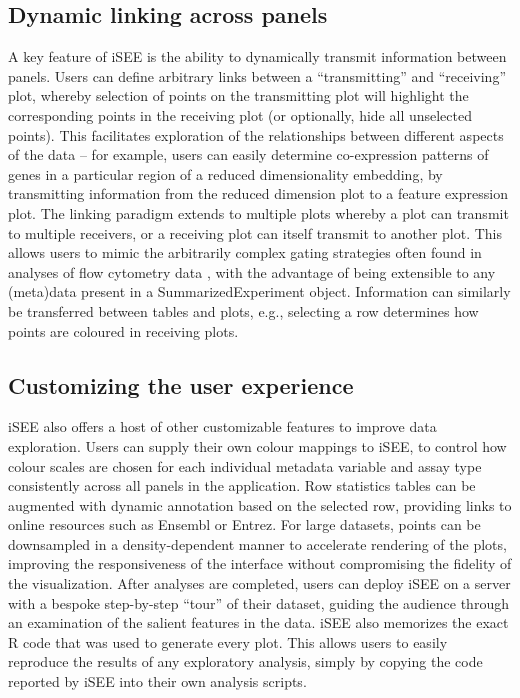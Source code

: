 \documentclass{bioinfo}
\begin{document}
\subsection{Dynamic linking across panels}
A key feature of iSEE is the ability to dynamically transmit information between panels. 
Users can define arbitrary links between a ``transmitting'' and ``receiving'' plot, whereby selection of points on the transmitting plot will highlight the corresponding points in the receiving plot (or optionally, hide all unselected points). 
This facilitates exploration of the relationships between different aspects of the data -- for example, users can easily determine co-expression patterns of genes in a particular region of a reduced dimensionality embedding, by transmitting information from the reduced dimension plot to a feature expression plot. 
The linking paradigm extends to multiple plots whereby a plot can transmit to multiple receivers, or a receiving plot can itself transmit to another plot.
This allows users to mimic the arbitrarily complex gating strategies often found in analyses of flow cytometry data \citep{finak2014opencyto}, with the advantage of being extensible to any (meta)data present in a SummarizedExperiment object. 
Information can similarly be transferred between tables and plots, e.g., selecting a row determines how points are coloured in receiving plots.

\subsection{Customizing the user experience}
iSEE also offers a host of other customizable features to improve data exploration. 
Users can supply their own colour mappings to iSEE, to control how colour scales are chosen for each individual  metadata variable and assay type consistently across all panels in the application. 
Row statistics tables can be augmented with dynamic annotation based on the selected row, providing links to online resources such as Ensembl or Entrez. 
For large datasets, points can be downsampled in a density-dependent manner to accelerate rendering of the plots, improving the responsiveness of the interface without compromising the fidelity of the visualization. 
After analyses are completed, users can deploy iSEE on a server with a bespoke step-by-step ``tour'' of their dataset, guiding the audience through an examination of the salient features in the data.
iSEE also memorizes the exact R code that was used to generate every plot. 
This allows users to easily reproduce the results of any exploratory analysis, simply by copying the code reported by iSEE into their own analysis scripts. 
\end{document}
